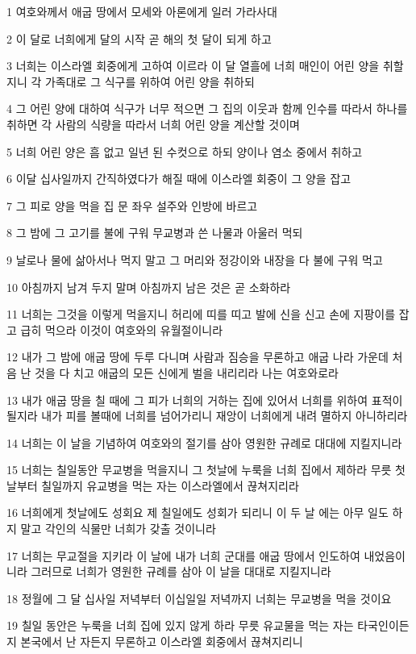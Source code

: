 \par 1 여호와께서 애굽 땅에서 모세와 아론에게 일러 가라사대
\par 2 이 달로 너희에게 달의 시작 곧 해의 첫 달이 되게 하고
\par 3 너희는 이스라엘 회중에게 고하여 이르라 이 달 열흘에 너희 매인이 어린 양을 취할지니 각 가족대로 그 식구를 위하여 어린 양을 취하되
\par 4 그 어린 양에 대하여 식구가 너무 적으면 그 집의 이웃과 함께 인수를 따라서 하나를 취하면 각 사람의 식량을 따라서 너희 어린 양을 계산할 것이며
\par 5 너희 어린 양은 흠 없고 일년 된 수컷으로 하되 양이나 염소 중에서 취하고
\par 6 이달 십사일까지 간직하였다가 해질 때에 이스라엘 회중이 그 양을 잡고
\par 7 그 피로 양을 먹을 집 문 좌우 설주와 인방에 바르고
\par 8 그 밤에 그 고기를 불에 구워 무교병과 쓴 나물과 아울러 먹되
\par 9 날로나 물에 삶아서나 먹지 말고 그 머리와 정강이와 내장을 다 불에 구워 먹고
\par 10 아침까지 남겨 두지 말며 아침까지 남은 것은 곧 소화하라
\par 11 너희는 그것을 이렇게 먹을지니 허리에 띠를 띠고 발에 신을 신고 손에 지팡이를 잡고 급히 먹으라 이것이 여호와의 유월절이니라
\par 12 내가 그 밤에 애굽 땅에 두루 다니며 사람과 짐승을 무론하고 애굽 나라 가운데 처음 난 것을 다 치고 애굽의 모든 신에게 벌을 내리리라 나는 여호와로라
\par 13 내가 애굽 땅을 칠 때에 그 피가 너희의 거하는 집에 있어서 너희를 위하여 표적이 될지라 내가 피를 볼때에 너희를 넘어가리니 재앙이 너희에게 내려 멸하지 아니하리라
\par 14 너희는 이 날을 기념하여 여호와의 절기를 삼아 영원한 규례로 대대에 지킬지니라
\par 15 너희는 칠일동안 무교병을 먹을지니 그 첫날에 누룩을 너희 집에서 제하라 무릇 첫날부터 칠일까지 유교병을 먹는 자는 이스라엘에서 끊쳐지리라
\par 16 너희에게 첫날에도 성회요 제 칠일에도 성회가 되리니 이 두 날 에는 아무 일도 하지 말고 각인의 식물만 너희가 갖출 것이니라
\par 17 너희는 무교절을 지키라 이 날에 내가 너희 군대를 애굽 땅에서 인도하여 내었음이니라 그러므로 너희가 영원한 규례를 삼아 이 날을 대대로 지킬지니라
\par 18 정월에 그 달 십사일 저녁부터 이십일일 저녁까지 너희는 무교병을 먹을 것이요
\par 19 칠일 동안은 누룩을 너희 집에 있지 않게 하라 무릇 유교물을 먹는 자는 타국인이든지 본국에서 난 자든지 무론하고 이스라엘 회중에서 끊쳐지리니
